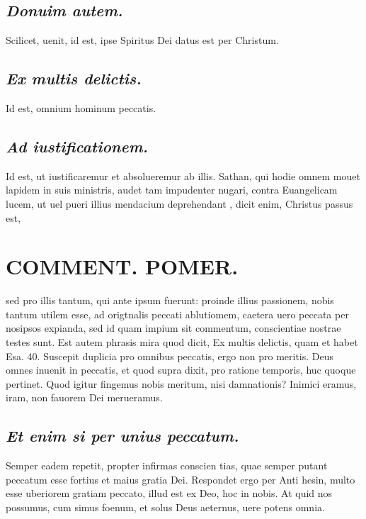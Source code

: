 \documentclass{article}
\begin{document}
\begin{pages}
\subsection*{\textit{Donuim autem.  }}\pstart Scilicet, uenit, id est, ipse Spiritus Dei datus est per Christum.   \pend
{}
{}
\subsection*{\textit{Ex multis delictis. }}\pstart Id est, omnium hominum peccatis.  \pend
{}
{}
\subsection*{\textit{Ad iustificationem. }}\pstart Id est, ut iustificaremur et absolueremur ab illis.  Sathan, qui hodie omnem mouet lapidem in suis ministris, audet tam impudenter nugari, contra Euangelicam lucem, ut uel pueri illius mendacium deprehendant , dicit enim, Christus passus est,  \pend
\section*{COMMENT. POMER.  }\pstart sed pro illis tantum, qui ante ipsum fuerunt: proinde illius passionem, nobis tantum utilem esse, ad origtnalis peccati ablutiomem, caetera uero peccata per nosipsos expianda, sed id quam impium sit commentum, conscientiae nostrae testes sunt. Est autem phrasis mira quod dicit, Ex multis delictis, quam et habet Esa. 40. Suscepit duplicia pro omnibus peccatis, ergo non pro meritis. Deus omnes inuenit in peccatis, et quod supra dixit, pro ratione temporis, huc quoque pertinet. Quod igitur fingemus nobis meritum, nisi damnationis? Inimici eramus, iram, non fauorem Dei merueramus.   \pend
{}
{}
\subsection*{\textit{Et enim si per unius peccatum. }}\pstart Semper eadem repetit, propter infirmas conscien tias, quae semper putant peccatum esse fortius et maius gratia Dei. Respondet ergo per Anti hesin, multo esse uberiorem gratiam peccato, illud est ex Deo, hoc in nobis. At quid nos possumus, cum simus foenum, et solus Deus aeternus, uere potens omnia.   \pend
{}
{}

\end{pages}
\end{document}

